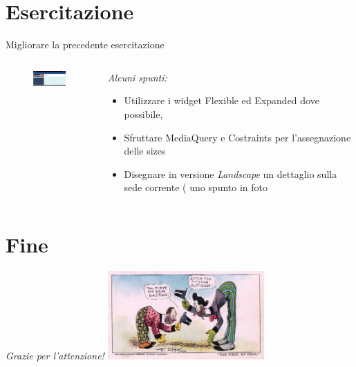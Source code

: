 \documentclass{../libs/presentation_format}
\begin{document}
\section{Esercitazione}
\begin{frame}{Migliorare la precedente esercitazione}
	\begin{minipage}[0.2\textheight]{\textwidth}
		\begin{columns}[T]
			\begin{column}{0.4\textwidth}
				\begin{figure}[htpb]
					\centering
					\includegraphics[width=3cm]{../libs/assignment-home-landscape}
				\end{figure}
			\end{column}
			\begin{column}{0.6\textwidth}
				\emph{Alcuni spunti:}
				\begin{itemize}
					\item Utilizzare i widget Flexible ed Expanded dove possibile,
					\item Sfruttare MediaQuery e Costraints per l'assegnazione delle sizes
					\item Disegnare in versione \emph{Landscape} un dettaglio sulla sede corrente ( uno spunto in foto
				\end{itemize}
			\end{column}
		\end{columns}
	\end{minipage}
\end{frame}




\section{Fine}
\begin{frame}{}
	\huge\emph{Grazie per l'attenzione!}
	\newline
	\vfill
	\hfill\includegraphics[width=6cm]{../libs/alphonse-gaston-regards}
\end{frame}
\end{document}
